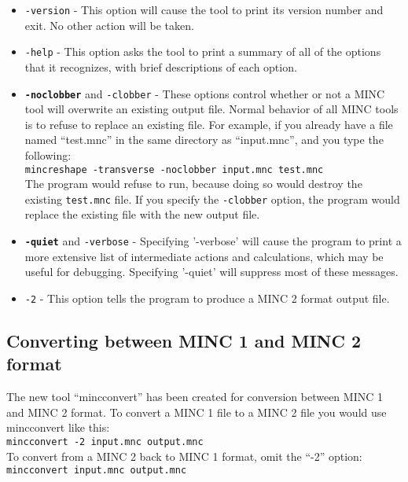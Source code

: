 \documentclass{article}
\begin{document}
\begin{itemize}
\item {\tt -version} - This option will cause the tool to print its
version number and exit.  No other action will be taken.
\item{\tt -help} - This option asks the tool to print a 
summary of all of the options that it recognizes, with brief descriptions
of each option.
\item \texttt{\textbf{-noclobber}} and {\tt -clobber} - These options control
whether or not a MINC tool will overwrite an existing output file.
Normal behavior of all MINC tools is to refuse to replace an existing
file.  For example, if you already have a file named ``test.mnc'' in
the same directory as ``input.mnc'', and you type the following:\\

\mbox{\tt mincreshape -transverse -noclobber input.mnc test.mnc}\\

The program would refuse to run, because doing so would destroy the
existing {\tt test.mnc} file.  If you specify the {\tt -clobber} option, the
program would replace the existing file with the new output file.

\item \texttt{\textbf{-quiet}} and {\tt -verbose} - Specifying
'-verbose' will cause the program to print a more extensive list of
intermediate actions and calculations, which may be useful for
debugging.  Specifying '-quiet' will suppress most of these messages.

\item \texttt{-2} - This option tells the program to produce a MINC 2
format output file.

\end{itemize}

\subsection{Converting between MINC 1 and MINC 2 format}
The new tool ``mincconvert'' has been created for conversion between
MINC 1 and MINC 2 format.  To convert a MINC 1 file to a MINC 2 file you
would use mincconvert like this:\\
\mbox{\tt mincconvert -2 input.mnc output.mnc} \\
To convert from a MINC 2 back to MINC 1 format, omit the ``-2'' option: \\
\mbox{\tt mincconvert input.mnc output.mnc}
\end{document}
